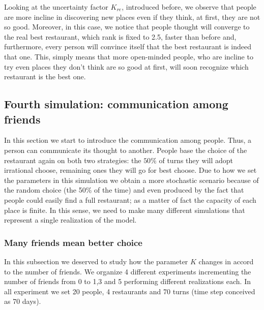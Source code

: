 \documentclass[10pt,a4paper,usenatbib]{article}
\begin{document}
Looking at the uncertainty factor $K_{re}$, introduced before, we observe that people are more incline in discovering new places even if they think, at first, they are not so good.
Moreover, in this case, we notice that people thought will converge to the real best restaurant, which rank is fixed to 2.5, faster than before and, furthermore, every person will convince itself that the best restaurant is indeed that one. 
This, simply means that more open-minded people, who are incline to try even places they don’t think are so good at first, will soon recognize which restaurant is the best one.



\subsection{Fourth simulation: communication among friends }
\label{subsec:friends}
In this section we start to introduce the communication among people. Thus, a person can communicate its thought to another. 
People base the choice of the restaurant again on both two strategies: the $50\%$ of turns they will adopt irrational choose, remaining ones they will go for best  choose.
Due to how we set the parameters in this simulation we obtain a more stochastic scenario because of the random choice (the 50\% of the time) and even produced by the fact that people could easily find a full restaurant; as a matter of fact the capacity of each place is finite.
In this sense, we need to make many different simulations that represent a single realization of the model.


\subsubsection{Many friends mean better choice}
In this subsection we deserved to study how the parameter $K$ changes in accord to the number of friends. We organize 4 different experiments incrementing the number of friends from 0 to 1,3 and 5 performing different realizations each.
In all experiment we set 20 people, 4 restaurants and 70 turns (time step conceived as 70 days).
\end{document}
